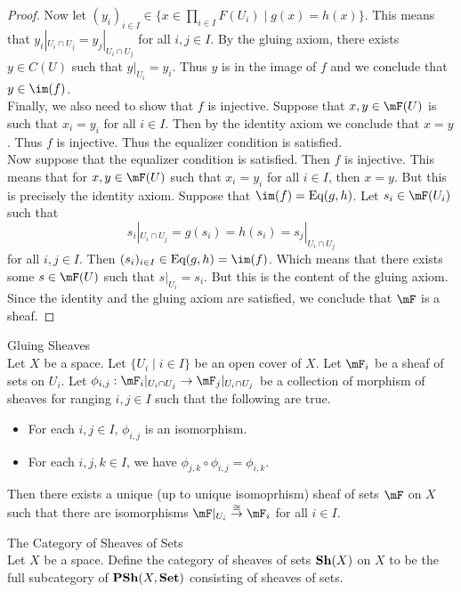 \documentclass[a4paper]{article}
\begin{document}
\begin{prp}{}{}
\begin{proof}
Now let $(y_i)_{i\in I}\in\{x\in\prod_{i\in I}F(U_i)\;|\;g(x)=h(x)\}$. This means that $y_i|_{U_i\cap U_j}=y_j|_{U_i\cap U_j}$ for all $i,j\in I$. By the gluing axiom, there exists $y\in C(U)$ such that $y|_{U_i}=y_i$. Thus $y$ is in the image of $f$ and we conclude that $y\in\im(f)$. \\

Finally, we also need to show that $f$ is injective. Suppose that $x,y\in\mF(U)$ is such that $x_i=y_i$ for all $i\in I$. Then by the identity axiom we conclude that $x=y$. Thus $f$ is injective. Thus the equalizer condition is satisfied. \\

Now suppose that the equalizer condition is satisfied. Then $f$ is injective. This means that for $x,y\in\mF(U)$ such that $x_i=y_i$ for all $i\in I$, then $x=y$. But this is precisely the identity axiom. Suppose that $\im(f)=\text{Eq}(g,h)$. Let $s_i\in\mF(U_i)$ such that $$s_i|_{U_i\cap U_j}=g(s_i)=h(s_i)=s_j|_{U_i\cap U_j}$$ for all $i,j\in I$. Then $(s_i)_{i\in I}\in\text{Eq}(g,h)=\im(f)$. Which means that there exists some $s\in\mF(U)$ such that $s|_{U_i}=s_i$. But this is the content of the gluing axiom. Since the identity and the gluing axiom are satisfied, we conclude that $\mF$ is a sheaf. 
\end{proof}
\end{prp}

\begin{prp}{Gluing Sheaves}{}\\
Let $X$ be a space. Let $\{U_i\;|\;i\in I\}$ be an open cover of $X$. Let $\mF_i$ be a sheaf of sets on $U_i$. Let $\phi_{i,j}:\mF_i|_{U_i\cap U_j}\to\mF_j|_{U_i\cap U_j}$ be a collection of morphism of sheaves for ranging $i,j\in I$ such that the following are true. 
\begin{itemize}
\item For each $i,j\in I$, $\phi_{i,j}$ is an isomorphism. 
\item For each $i,j,k\in I$, we have $\phi_{j,k}\circ\phi_{i,j}=\phi_{i,k}$. 
\end{itemize}
Then there exists a unique (up to unique isomoprhism) sheaf of sets $\mF$ on $X$ such that there are isomorphisms $\mF|_{U_i}\overset{\cong}{\to}\mF_i$ for all $i\in I$. 
\end{prp}

\begin{defn}{The Category of Sheaves of Sets}{}\\
Let $X$ be a space. Define the category of sheaves of sets $\bold{Sh}(X)$ on $X$ to be the full subcategory of $\bold{PSh}(X,\bold{Set})$ consisting of sheaves of sets. 
\end{defn}
\end{document}
